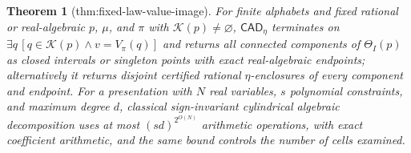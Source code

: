 \documentclass{article}
\newtheorem{theorem}{Theorem}
\begin{document}
\begin{theorem}[thm:fixed-law-value-image]\label{thm:fixed-law-value-image}
For finite alphabets and fixed rational or real-algebraic \(p\), \(\mu\), and \(\pi\) with \(\mathcal K(p)\ne\varnothing\), \(\mathsf{CAD}_\eta\) terminates on \(\exists q\,[q\in\mathcal K(p)\wedge v=V_\pi(q)]\) and returns all connected components of \(\Theta_I(p)\) as closed intervals or singleton points with exact real-algebraic endpoints; alternatively it returns disjoint certified rational \(\eta\)-enclosures of every component and endpoint. For a presentation with \(N\) real variables, \(s\) polynomial constraints, and maximum degree \(d\), classical sign-invariant cylindrical algebraic decomposition uses at most \((sd)^{2^{O(N)}}\) arithmetic operations, with exact coefficient arithmetic, and the same bound controls the number of cells examined.
\end{theorem}
\end{document}

